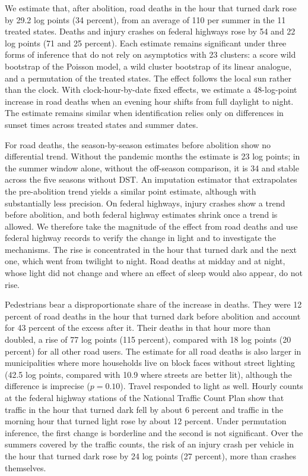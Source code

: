 We estimate that, after abolition, road deaths in the hour that turned dark rose by 29.2 log points (34 percent), from an average of 110 per summer in the 11 treated states. Deaths and injury crashes on federal highways rose by 54 and 22 log points (71 and 25 percent). Each estimate remains significant under three forms of inference that do not rely on asymptotics with 23 clusters: a score wild bootstrap of the Poisson model, a wild cluster bootstrap of its linear analogue, and a permutation of the treated states. The effect follows the local sun rather than the clock. With clock-hour-by-date fixed effects, we estimate a 48-log-point increase in road deaths when an evening hour shifts from full daylight to night. The estimate remains similar when identification relies only on differences in sunset times across treated states and summer dates.

For road deaths, the season-by-season estimates before abolition show no differential trend. Without the pandemic months the estimate is 23 log points; in the summer window alone, without the off-season comparison, it is 34 and stable across the five seasons without DST. An imputation estimator that extrapolates the pre-abolition trend yields a similar point estimate, although with substantially less precision. On federal highways, injury crashes show a trend before abolition, and both federal highway estimates shrink once a trend is allowed. We therefore take the magnitude of the effect from road deaths and use federal highway records to verify the change in light and to investigate the mechanisms. The rise is concentrated in the hour that turned dark and the next one, which went from twilight to night. Road deaths at midday and at night, whose light did not change and where an effect of sleep would also appear, do not rise.

Pedestrians bear a disproportionate share of the increase in deaths. They were 12 percent of road deaths in the hour that turned dark before abolition and account for 43 percent of the excess after it. Their deaths in that hour more than doubled, a rise of 77 log points (115 percent), compared with 18 log points (20 percent) for all other road users. The estimate for all road deaths is also larger in municipalities where more households live on block faces without street lighting (42.5 log points, compared with 10.9 where streets are better lit), although the difference is imprecise ($p=0.10$). Travel responded to light as well. Hourly counts at the federal highway stations of the National Traffic Count Plan show that traffic in the hour that turned dark fell by about 6 percent and traffic in the morning hour that turned light rose by about 12 percent. Under permutation inference, the first change is borderline and the second is not significant. Over the summers covered by the traffic counts, the risk of an injury crash per vehicle in the hour that turned dark rose by 24 log points (27 percent), more than crashes themselves.

